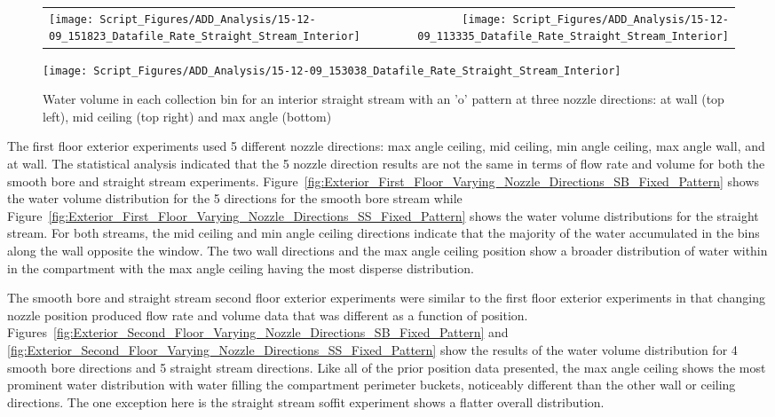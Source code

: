 \documentclass{book}
\begin{document}
\begin{figure}[ht]
\begin{tabular*}{\textwidth}{lr}
\texttt{[image: Script\_Figures/ADD\_Analysis/15-12-09\_151823\_Datafile\_Rate\_Straight\_Stream\_Interior]} &
\texttt{[image: Script\_Figures/ADD\_Analysis/15-12-09\_113335\_Datafile\_Rate\_Straight\_Stream\_Interior]} \\
\end{tabular*}
\centering
\texttt{[image: Script\_Figures/ADD\_Analysis/15-12-09\_153038\_Datafile\_Rate\_Straight\_Stream\_Interior]}
\caption{Water volume in each collection bin for an interior straight stream with an 'o' pattern at three nozzle directions: at wall (top left), mid ceiling (top right) and max angle (bottom)}
\label{fig:Interior_Varying_Nozzle_Direction_SS_O_Pattern}
\end{figure}

\clearpage

The first floor exterior experiments used 5 different nozzle directions: max angle ceiling, mid ceiling, min angle ceiling, max angle wall, and at wall. The statistical analysis indicated that the 5 nozzle direction results are not the same in terms of flow rate and volume for both the smooth bore and straight stream experiments. Figure~\ref{fig:Exterior_First_Floor_Varying_Nozzle_Directions_SB_Fixed_Pattern} shows the water volume distribution for the 5 directions for the smooth bore stream while Figure~\ref{fig:Exterior_First_Floor_Varying_Nozzle_Directions_SS_Fixed_Pattern} shows the water volume distributions for the straight stream. For both streams, the mid ceiling and min angle ceiling directions indicate that the majority of the water accumulated in the bins along the wall opposite the window. The two wall directions and the max angle ceiling position show a broader distribution of water within in the compartment with the max angle ceiling having the most disperse distribution.

The smooth bore and straight stream second floor exterior experiments were similar to the first floor exterior experiments in that changing nozzle position produced flow rate and volume data that was different as a function of position. Figures~\ref{fig:Exterior_Second_Floor_Varying_Nozzle_Directions_SB_Fixed_Pattern} and \ref{fig:Exterior_Second_Floor_Varying_Nozzle_Directions_SS_Fixed_Pattern} show the results of the water volume distribution for 4 smooth bore directions and 5 straight stream directions. Like all of the prior position data presented, the max angle ceiling shows the most prominent water distribution with water filling the compartment perimeter buckets, noticeably different than the other wall or ceiling directions. The one exception here is the straight stream soffit experiment shows a flatter overall distribution. 
\end{document}

